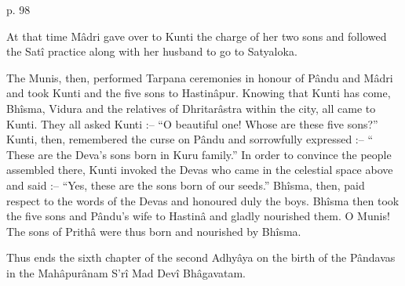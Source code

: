  

p. 98

 

At that time Mâdri gave over to Kunti the charge of her two sons and followed the Satî practice along with her husband to go to Satyaloka.

 

The Munis, then, performed Tarpana ceremonies in honour of Pându and Mâdri and took Kunti and the five sons to Hastinâpur. Knowing that Kunti has come, Bhîsma, Vidura and the relatives of Dhritarâstra within the city, all came to Kunti. They all asked Kunti :-- “O beautiful one! Whose are these five sons?” Kunti, then, remembered the curse on Pându and sorrowfully expressed :-- “ These are the Deva's sons born in Kuru family.” In order to convince the people assembled there, Kunti invoked the Devas who came in the celestial space above and said :-- “Yes, these are the sons born of our seeds.” Bhîsma, then, paid respect to the words of the Devas and honoured duly the boys. Bhîsma then took the five sons and Pându's wife to Hastinâ and gladly nourished them. O Munis! The sons of Prithâ were thus born and nourished by Bhîsma.

 

Thus ends the sixth chapter of the second Adhyâya on the birth of the Pândavas in the Mahâpurânam S’rî Mad Devî Bhâgavatam.